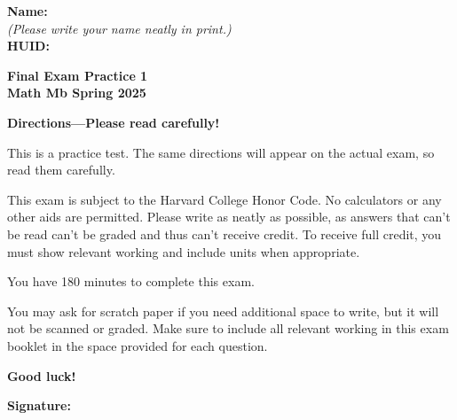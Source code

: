 \documentclass{article}
\begin{document}
{\large \mbox{} \hfill \bf Name:\underline{\hspace{3in}}}\\[2pt]
{\mbox{} \hfill \it (Please write your name neatly in print.)}\\[12pt]
{\large \mbox{} \hfill \bf HUID:\underline{\hspace{3in}}}
 
\medskip
 
\noindent
{\large\bf
Final Exam Practice 1\\
Math Mb Spring 2025}
\noindent


{\Large
\begin{center}\textbf{Directions---Please read carefully!} \end{center}}

This is a practice test. The same directions will appear on the actual exam, so read them carefully.

\hrulefill 


This exam is subject to the Harvard College Honor Code. No calculators or any other aids are permitted.  Please write as neatly as possible, as answers that can't be read can't be graded and thus can't receive credit. To receive full credit, you must show relevant working
and include units when appropriate. 

You have 180 minutes to complete this exam. 

You may ask for scratch paper if you need additional space to write, but it will not be scanned or graded. Make sure to include all relevant working in this exam booklet in the space provided for each question.

\begin{center}\textbf{Good luck!}\end{center}


\vfill

\vspace{0.3in}

{\large \mbox{} \hfill \bf Signature:\underline{\hspace{3in}}}
\thispagestyle{empty}

\newpage
\end{document}
